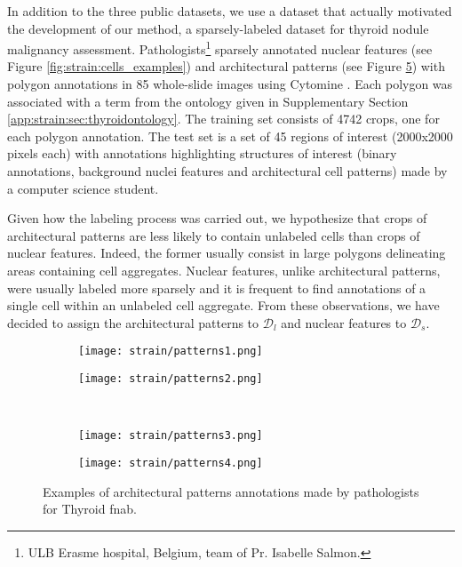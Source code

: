 In addition to the three public datasets, we use a dataset that actually motivated the development of our method, a sparsely-labeled dataset for thyroid nodule malignancy assessment. Pathologists\footnote{ULB Erasme hospital, Belgium, team of Pr. Isabelle Salmon.} sparsely annotated nuclear features (see Figure \ref{fig:strain:cells_examples}) and architectural patterns (see Figure \ref{fig:strain:patterns_examples}) with polygon annotations in 85 whole-slide images using Cytomine \cite{maree2016collaborative}. Each polygon was associated with a term from the ontology given in Supplementary Section \ref{app:strain:sec:thyroidontology}. The training set consists of 4742 crops, one for each polygon annotation. The test set is a set of 45 regions of interest (2000x2000 pixels each) with annotations highlighting structures of interest (binary annotations, background \vs nuclei features and architectural cell patterns) made by a computer science student.

Given how the labeling process was carried out, we hypothesize that crops of architectural patterns are less likely to contain unlabeled cells than crops of nuclear features. Indeed, the former usually consist in large polygons delineating areas containing cell aggregates. Nuclear features, unlike architectural patterns, were usually labeled more sparsely and it is frequent to find annotations of a single cell within an unlabeled cell aggregate. From these observations, we have decided to assign the architectural patterns to $\mathcal{D}_l$ and nuclear features to $\mathcal{D}_s$.


\begin{figure}
    \centering
    \begin{subfigure}{.48\textwidth}
      \centering
      \texttt{[image: strain/patterns1.png]}
      \caption{}
      \label{sfig:strain:pattern1}
    \end{subfigure}
    \begin{subfigure}{.48\textwidth}
      \centering
      \texttt{[image: strain/patterns2.png]}
      \caption{}
      \label{sfig:strain:pattern2}
    \end{subfigure} \\
    \begin{subfigure}{.48\textwidth}
      \centering
      \texttt{[image: strain/patterns3.png]}
      \caption{}
      \label{sfig:strain:pattern3}
    \end{subfigure}
    \begin{subfigure}{.48\textwidth}
      \centering
      \texttt{[image: strain/patterns4.png]}
      \caption{}
      \label{sfig:strain:pattern4}
    \end{subfigure}
    \caption{Examples of architectural patterns annotations made by pathologists for Thyroid \acrshort{fnab}.}
    \label{fig:strain:patterns_examples}
\end{figure}


